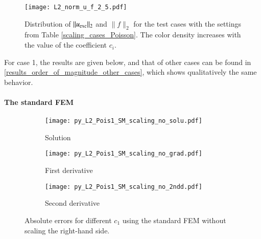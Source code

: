 \documentclass[review,3p]{elsarticle}
\begin{document}
\begin{figure}[!ht]
\centering
      \texttt{[image: L2\_norm\_u\_f\_2\_5.pdf]}
\caption{Distribution of $\|u_{\rm exc}\|_2$ and $\|f\|_2$ for the test cases with the settings from Table \ref{scaling_cases_Poisson}. The color density increases with the value of the coefficient $c_i$.}
\label{L2 norm u f}
\end{figure}

For case 1, the results are given below, and that of other cases can be found in \ref{results_order_of_magnitude_other_cases}, which shows qualitatively the same behavior.

\paragraph{The standard FEM}		\label{scaling_std_FEM}

\begin{figure}[!ht]
    \begin{subfigure}{5.5cm}
        \texttt{[image: py\_L2\_Pois1\_SM\_scaling\_no\_solu.pdf]}
        \caption{Solution}
        \label{py_L2_Pois1_SM_scaling_no_solu}
    \end{subfigure}
    \hspace{-0.2cm}
    \begin{subfigure}{5.5cm}
        \texttt{[image: py\_L2\_Pois1\_SM\_scaling\_no\_grad.pdf]}
        \caption{First derivative}
        \label{py_L2_Pois1_SM_scaling_no_grad}
    \end{subfigure}
    \hspace{-0.2cm}
    \begin{subfigure}{5.5cm}
        \texttt{[image: py\_L2\_Pois1\_SM\_scaling\_no\_2ndd.pdf]}
        \caption{Second derivative}
        \label{py_L2_Pois1_SM_scaling_no_2ndd}
    \end{subfigure}
\caption{Absolute errors for different $c_1$ using the standard FEM without scaling the right-hand side.}   
\label{Pois_SM_rhs_solu orig}
\end{figure}
\end{document}
